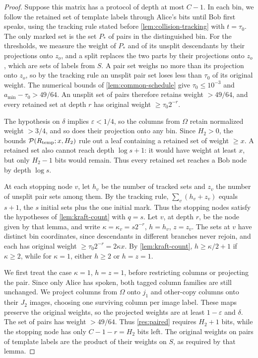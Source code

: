 \documentclass[11pt,letterpaper]{article} \usepackage[utf8]{inputenc}
\theoremstyle{plain} \newtheorem{theorem}{Theorem}[section]
\theoremstyle{definition} \newaliascnt{definition}{theorem}
\newcommand{\RP}[3]{\mathcal{P}(#1;#2,#3)}
\begin{document}
\begin{proof}
Suppose this matrix has a protocol of depth at most $C-1$. In each bin, we
follow the retained set of template labels through Alice's bits until Bob
first speaks, using the tracking rule stated before
\cref{lem:collision-tracking} with $t=\tau_0$. The only marked set is the set
$P_*$ of pairs in the distinguished bin. For the thresholds, we measure the
weight of $P_*$ and of its unsplit descendants by their projections onto $z_o$, and a
split replaces the two parts by their projections onto $z_o$, which are sets
of labels from $S$. A pair set weighs no more than its projection onto $z_o$,
so by the tracking rule an unsplit pair set loses less than $\tau_0$ of its original weight.
The numerical bounds of \cref{lem:common-schedule} give
$\tau_0\le10^{-3}$ and $a_{\min}-\tau_0>49/64$. An unsplit set of pairs therefore
retains weight $>49/64$, and every retained set at depth $r$ has original
weight $\ge\tau_0 2^{-r}$.

The hypothesis on $\delta$ implies $\varepsilon<1/4$, so the columns from $\Omega$
retain normalized weight $>3/4$, and so does their projection onto any bin.
Since $H_2>0$, the bounds $\RP{R_{\rm temp}}{x}{H_2}$ rule out a leaf
containing a retained set of weight $\ge x$. A retained set also cannot reach depth $\log s+1$:
it would have weight at least $x$, but only $H_2-1$ bits would remain.
Thus every retained set reaches a Bob node by depth $\log s$.

At each stopping node $v$, let $h_v$ be the number of tracked sets and $z_v$
the number of unsplit pair sets among them. By the tracking rule,
$\sum_v(h_v+z_v)$ equals $s+1$, the $s$ initial sets plus the one initial
mark. Thus the stopping nodes satisfy the hypotheses of
\cref{lem:kraft-count} with $q=s$.
Let $v$, at depth $r$, be the node given by that lemma, and write $\kappa=\kappa_v=s2^{-r}$,
$h=h_v$, $z=z_v$. The sets at $v$ have distinct bin coordinates, since
descendants in different branches never rejoin, and each has original weight
$\ge\tau_0 2^{-r}=2\kappa x$. By \cref{lem:kraft-count},
$h\ge\kappa/2+1$ if $\kappa\ge2$, while for $\kappa=1$, either $h\ge2$ or $h=z=1$.

We first treat the case $\kappa=1$, $h=z=1$, before restricting columns or projecting the pair.
Since only Alice has spoken, both tagged column families are still unchanged. We project columns from $\Omega$
onto $j_1$ and other-copy columns onto their $J_2$ images, choosing one surviving
column per image label. These maps preserve the original weights, so the projected weights
are at least $1-\varepsilon$ and $\delta$. The set of pairs has weight
$>49/64$. Thus \cref{res:paired} requires $H_2+1$ bits, while the stopping
node has only $C-1-r=H_2$ bits left. The original weights on pairs of template
labels are the product of their weights on $S$, as required by that lemma.


\end{proof}
\end{document}
